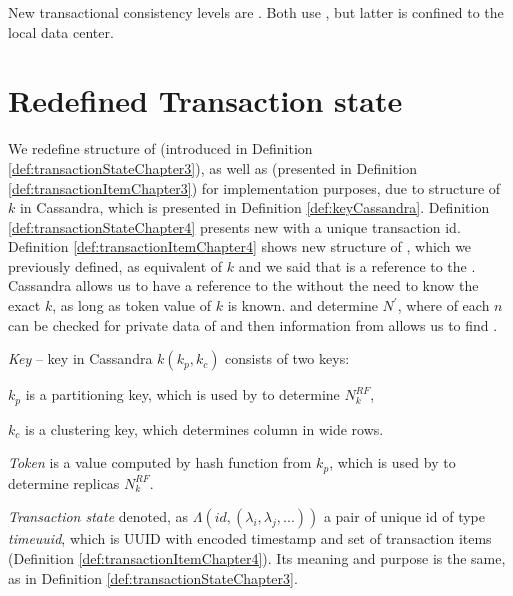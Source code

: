 New transactional consistency levels are . Both use \mpt, but latter is confined to the local data center.

\section{Redefined Transaction state}
We redefine structure of \txState (introduced in Definition \ref{def:transactionStateChapter3}), as well as \txItems (presented in Definition \ref{def:transactionItemChapter3}) for implementation purposes, due to structure of $k$ in Cassandra, which is presented in Definition \ref{def:keyCassandra}. Definition \ref{def:transactionStateChapter4} presents new \txState with a unique transaction id. Definition \ref{def:transactionItemChapter4} shows new structure of \txItem, which we previously defined, as equivalent of $k$ and we said that \txItem is a reference to the . Cassandra allows us to have a reference to the  without the need to know the exact $k$, as long as token value of $k$ is known. \txItem and \topology determine $N^'$, where \txStorage of each $n$ can be checked for private data of \transaction and then information from \txItem allows us to find .


\begin{definition}
\label{def:keyCassandra}
\emph{Key} -- key in Cassandra $k(k_p,k_c)$ consists of two keys: 
\begin{enumerate*}[label=\alph*)]
\item $k_p$ is a partitioning key, which is used by \topology to determine $\mathit{N}^{RF}_k$,
\item $k_c$ is a clustering key, which determines column in wide rows.
\end{enumerate*}
\end{definition}

\begin{definition}
\label{def:tokenChapter4}
\emph{Token} is a value computed by hash function from $k_p$, which is used by \topology to determine replicas $\mathit{N}^{RF}_k$.
\end{definition}


\begin{definition}
\label{def:transactionStateChapter4}
\emph{Transaction state} denoted, as $\Lambda(\mathit{id}, (\lambda_{i}, \lambda_{j}, ...))$ a pair of unique id of type \emph{timeuuid}, which is UUID with encoded timestamp \cite{CassandraUUID} and set of transaction items (Definition \ref{def:transactionItemChapter4}). Its meaning and purpose is the same, as in Definition \ref{def:transactionStateChapter3}.
\end{definition}

